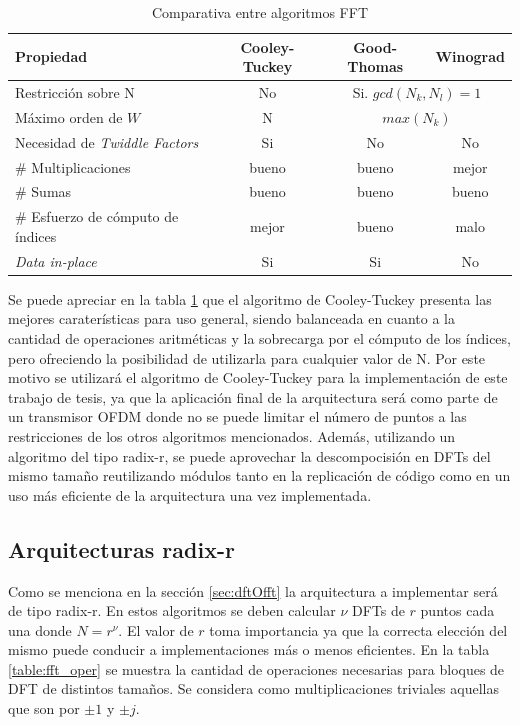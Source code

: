 \begin{table}[h]
\begin{tabular}{l c c c}
\textbf{Propiedad} & \textbf{Cooley-Tuckey} & \textbf{Good-Thomas} & \textbf{Winograd} \\ \hline
Restricción sobre N & No & \multicolumn{2}{c}{Si. $gcd(N_k,N_l)=1$}\\ \hline
Máximo orden de $W$ & N & \multicolumn{2}{c}{$max(N_k)$} \\ \hline
Necesidad de \textit{Twiddle Factors} & Si & No & No \\ \hline
\# Multiplicaciones & bueno & bueno & mejor \\
\# Sumas & bueno & bueno & bueno \\
\# Esfuerzo de cómputo de índices & mejor & bueno & malo \\
\textit{Data in-place} & Si & Si & No \\ \hline
\end{tabular}
\caption{Comparativa entre algoritmos FFT}
\label{table:fft_comp}
\end{table}
 
Se puede apreciar en la tabla \ref{table:fft_comp} que el algoritmo de Cooley-Tuckey presenta las
mejores caraterísticas para uso general, siendo balanceada en cuanto a la cantidad de operaciones
aritméticas y la sobrecarga por el cómputo de los índices, pero ofreciendo la posibilidad de
utilizarla para cualquier valor de N.
Por este motivo se utilizará el algoritmo de Cooley-Tuckey para la implementación de este trabajo
de tesis, ya que la aplicación final de la arquitectura será como parte de un transmisor OFDM donde
no se puede limitar el número de puntos a las restricciones de los otros algoritmos mencionados. Además,
utilizando un algoritmo del tipo radix-r, se puede aprovechar la descompocisión en DFTs del mismo
tamaño reutilizando módulos tanto en la replicación de código como en un uso más eficiente de la
arquitectura una vez implementada.

\subsection{Arquitecturas radix-r}

Como se menciona en la sección \ref{sec:dftOfft} la arquitectura a implementar será de tipo radix-r.
En estos algoritmos se deben calcular $\nu$ DFTs de $r$ puntos cada una donde $N=r^\nu$. El valor
de $r$ toma importancia ya que la correcta elección del mismo puede conducir a implementaciones más
o menos eficientes. En la tabla \ref{table:fft_oper} se muestra la cantidad de operaciones
necesarias para bloques de DFT de distintos tamaños. Se considera como multiplicaciones triviales aquellas que son por $\pm 1$
y $\pm j$.

